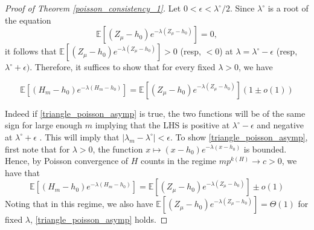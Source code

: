 \documentclass[12pt]{article}
\numberwithin{equation}{section}
\begin{document}
\begin{proof}[Proof of Theorem \ref{poisson_consistency_1}]



Let \( 0 < \epsilon < \lambda^{\circ}/2\). Since \( \lambda^{\circ} \) is a root of the equation  
\[
\mathbb{E}\left[(Z_{\mu} - h_0) e^{-\lambda(Z_{\mu} - h_0)}\right] = 0,
\]  
it follows that $\mathbb{E}[(Z_{\mu}-h_0)e^{-\lambda(Z_{\mu}-h_0)}] > 0$ (resp, $<0$) at $\lambda=\lambda^{\circ} - \epsilon$ (resp, $\lambda^{\circ} + \epsilon)$. Therefore, it suffices to show that for every fixed $\lambda>0$, we have 

\begin{equation}\mathbb{E}[(H_m-h_0)e^{-\lambda(H_m-h_0)}]=\mathbb{E}[(Z_{\mu}-h_0)e^{-\lambda(Z_{\mu}-h_0)}](1\pm o(1))
\label{triangle_poisson_asymp}
\end{equation}


Indeed if \eqref{triangle_poisson_asymp} is true, the two functions will be of the same sign for large enough $m$ implying that the LHS is positive at $\lambda^{\circ}-\epsilon$ and negative at $\lambda^{\circ}+\epsilon$ . This will imply that $|\lambda_m-\lambda^{\circ}|<\epsilon$.
To show \eqref{triangle_poisson_asymp}, first note that for $\lambda>0$, the function $x\mapsto (x-h_0)e^{-\lambda(x-h_0)}$ is bounded. Hence, by Poisson convergence of \(H\) counts in the regime $mp^{k(H)}\rightarrow c>0$, we have that
$$\mathbb{E}[(H_m-h_0)e^{-\lambda(H_m-h_0)}]=\mathbb{E}[(Z_{\mu}-h_0)e^{-\lambda(Z_{\mu}-h_0)}]\pm o(1)$$
Noting that in this regime, we also have $\mathbb{E}[(Z_{\mu}-h_0)e^{-\lambda(Z_{\mu}-h_0)}]=\Theta(1)$ for fixed $\lambda$, \eqref{triangle_poisson_asymp} holds.


\end{proof}
\end{document}
